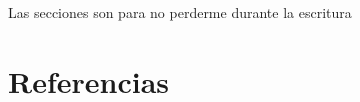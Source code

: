 \documentclass[12pt,letterpaper,draft]{article}
\begin{document}
%
\tableofcontents
\pagebreak
Las secciones son para no perderme durante la escritura




\section {Referencias}\label{sec:refs}
\printbibliography[heading=none]
\end{document}
